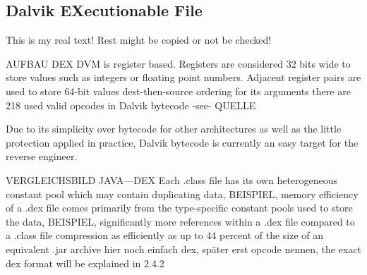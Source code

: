 \subsection{Dalvik EXecutionable File} \label{subsection:android-dalvik}
This is my real text! Rest might be copied or not be checked!

%
AUFBAU DEX
DVM is register based. Registers are considered 32 bits wide to store values such as integers or floating point numbers. Adjacent register pairs are used to store 64-bit values\newline
dest-then-source ordering for its arguments\newline
there are 218 used valid opcodes in Dalvik bytecode -see- QUELLE \newline

Due to its simplicity over bytecode for other architectures as well as the little protection applied in practice, Dalvik bytecode is currently an easy target for the reverse engineer.

VERGLEICHSBILD JAVA---DEX\cite{ehringerDalvik}\newline
Each .class file has its own heterogeneous constant pool which may contain duplicating data, BEISPIEL, memory efficiency of a .dex file comes primarily from the type-specific constant pools used to store the data, BEISPIEL,\newline
significantly more references within a .dex file compared to a .class file\cite{ehringerDalvik}\newline
compression as efficiently as up to 44 percent of the size of an equivalent .jar archive\cite{ehringerDalvik}\newline
hier noch einfach dex, später erst opcode nennen, the exact dex format will be explained in 2.4.2\newline

\cite{kovachevaMaster} \cite{ehringerDalvik}
%

